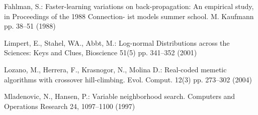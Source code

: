 \documentclass{sig-alternate}
\begin{document}
\begin{thebibliography}{10}
Fahlman, S.: 
Faster-learning variations on back-propagation: An empirical study, in Proceedings of the 1988 Connection- ist models summer school. M. Kaufmann pp. 38--51 (1988)

Limpert, E., Stahel, WA., Abbt, M.: 
Log-normal Distributions across the Sciences: Keys and Clues, Bioscience 51(5) pp. 341--352 (2001)

Lozano, M., Herrera, F., Krasnogor, N., Molina D.:
Real-coded memetic algorithms with crossover hill-climbing. Evol. Comput. 12(3) pp. 273--302 (2004)

Mladenovic, N., Hansen, P.: 
Variable neighborhood search. {Computers and Operations Research} {24}, 1097--1100 (1997)

\end{thebibliography}
\end{document}
